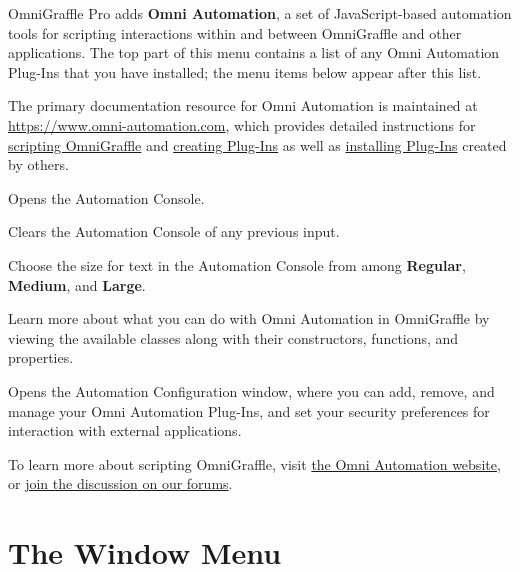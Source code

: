 \documentclass[../main.tex]{subfiles}
\begin{document}
  \begin{ogpro}
    OmniGraffle Pro adds \textbf{Omni Automation}, a set of JavaScript-based automation tools for
    scripting interactions within and between OmniGraffle and other applications. The top part of
    this menu contains a list of any Omni Automation Plug-Ins that you have installed; the menu
    items below appear after this list.

    \begin{ognote}
      The primary documentation resource for Omni Automation is maintained at
      \href{https://www.omni-automation.com}{https://www.omni-automation.com}, which provides
      detailed instructions for
      \href{https://omni-automation.com/tutorial/og-macos/index.html}{scripting OmniGraffle} and
      \href{https://omni-automation.com/plugins/index.html}{creating Plug-Ins} as well as
      \href{https://omni-automation.com/plugins/installation.html}{installing Plug-Ins} created by
      others.
    \end{ognote}

    \begin{description}[style=nextline]
      \item[{Show Console}] Opens the Automation Console.
      \item[{Clear Console (\textbf{Command-K})}] Clears the Automation Console of any previous
        input.
      \item[{Console Text Size}] Choose the size for text in the Automation Console from among
        \textbf{Regular}, \textbf{Medium}, and \textbf{Large}.
      \item[{API Reference}] Learn more about what you can do with Omni Automation in OmniGraffle
        by viewing the available classes along with their constructors, functions, and properties.
      \item[{Configure}] Opens the Automation Configuration window, where you can add, remove, and
        manage your Omni Automation Plug-Ins, and set your security preferences for interaction
        with external applications.
    \end{description}

    To learn more about scripting OmniGraffle, visit \href{https://www.omni-automation.com}{the
    Omni Automation website}, or
    \href{https://discourse.omnigroup.com/c/omnigraffle/omnigraffle-automation}{join the
    discussion on our forums}.
  \end{ogpro}

  \section{The Window Menu}
\end{document}
